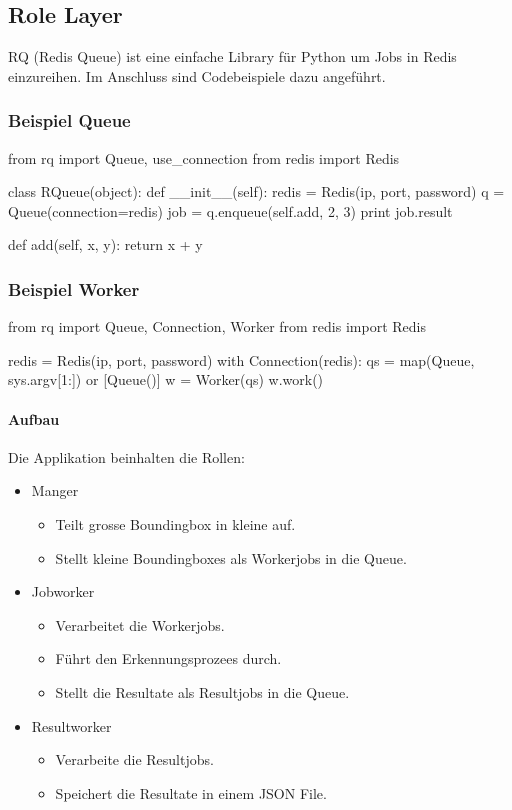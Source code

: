 
\subsection{Role Layer}

\Gls{RQ} \cite{RQ} (Redis Queue) ist eine einfache Library für Python um Jobs in Redis einzureihen. Im Anschluss sind Codebeispiele dazu angeführt.

\subsubsection{Beispiel Queue}
\begin{python}
from rq import Queue, use_connection
from redis import Redis

class RQueue(object):
   def __init__(self):
       redis = Redis(ip, port, password)
       q = Queue(connection=redis)
       job = q.enqueue(self.add, 2, 3)
       print job.result

   def add(self, x, y):
       return x + y
\end{python}

\subsubsection{Beispiel Worker}
\begin{python}
from rq import Queue, Connection, Worker
from redis import Redis

redis = Redis(ip, port, password)
with Connection(redis):
   qs = map(Queue, sys.argv[1:]) or [Queue()]
   w = Worker(qs)
   w.work()
\end{python}

\paragraph{Aufbau} Die Applikation beinhalten die Rollen:
\begin{itemize}
	\item Manger
	\begin{itemize}
		\item Teilt grosse Boundingbox in kleine auf.
		\item Stellt kleine Boundingboxes als Workerjobs in die Queue.
	\end{itemize}
		\item Jobworker
	\begin{itemize}
		\item Verarbeitet die Workerjobs.
		\item Führt den Erkennungsprozees durch.
		\item Stellt die Resultate als Resultjobs in die Queue.
	\end{itemize}
		\item Resultworker
	\begin{itemize}
		\item Verarbeite die Resultjobs.
		\item Speichert die Resultate in einem JSON File.
	\end{itemize}
\end{itemize}


\newpage
